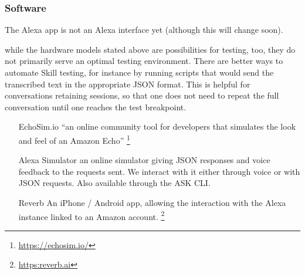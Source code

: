 

\subsubsection*{Software}

The Alexa app is not an Alexa interface yet (although this will change soon).

while the hardware models stated above are possibilities for testing, too, they do not primarily serve an optimal testing environment. There are better ways to automate Skill testing, for instance by running scripts that would send the transcribed text in the appropriate JSON format. This is helpful for conversations retaining sessions, so that one does not need to repeat the full conversation until one reaches the test breakpoint.

\begin{itemize}
	\item[EchoSim.io] ``an online community tool for developers that simulates the look and feel of an Amazon Echo'' \footnote{\url{https://echosim.io/}}
	\item[Alexa Simulator] an online simulator giving JSON responses and voice feedback to the requests sent. We interact with it either through voice or with JSON requests. Also available through the ASK CLI.
	\item[Reverb] An iPhone / Android app, allowing the interaction with the Alexa instance linked to an Amazon account. \footnote{\url{https:reverb.ai}} 
\end{itemize}



















